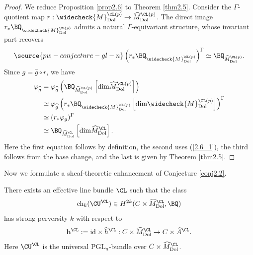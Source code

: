 \begin{proof}
We reduce Proposition \ref{prop2.6} to Theorem \ref{thm2.5}. Consider the $\Gamma$-quotient map $r: \widecheck{M}^{\CL(p)}_{\mathrm{Dol}} \to \widehat{M}^{\CL(p)}_{\mathrm{Dol}}$. The direct image $r_* \BQ_{\widecheck{M}^{\CL(p)}_{\mathrm{Dol}}}$ admits a natural $\Gamma$-equivariant structure, whose invariant part recovers
\begin{equation}\label{2.6_1}
\source{pw-conjecture-gl-n}
\left(r_* \BQ_{\widecheck{M}^{\CL(p)}_{\mathrm{Dol}}}\right)^{\Gamma} \simeq \BQ_{\widehat{M}^{\CL(p)}_{\mathrm{Dol}}}.
\end{equation}
Since $g = \widehat{g}\circ r$, we have
\begin{align*}
\varphi_{\widehat{g}} & = \varphi_{\widehat{g}}\left(\BQ_{\widehat{M}^{\CL(p)}_{\mathrm{Dol}}}\left[\mathrm{dim} \widehat{M}^{\CL(p)}_{\mathrm{Dol}}\right]\right) \\ & \simeq \varphi_{\widehat{g}}\left(r_* \BQ_{\widecheck{M}^{\CL(p)}_{\mathrm{Dol}}}\left[\mathrm{dim} \widecheck{M}^{\CL(p)}_{\mathrm{Dol}}\right]\right)^{\Gamma}\\
& \simeq (r_* \varphi_g)^\Gamma \\ & \simeq  \BQ_{\widehat{M}^{\CL}_{\mathrm{Dol}}}\left[\mathrm{dim} \widehat{M}^{\CL}_{\mathrm{Dol}}\right].
\end{align*}
Here the first equation follows by definition, the second uses (\ref{2.6_1}), the third follows from the base change, and the last is given by Theorem \ref{thm2.5}.
\end{proof}


Now we formulate a sheaf-theoretic enhancement of Conjecture \ref{conj2.2}.

\begin{thm}
\notready\label{conj2.7}
There exists an effective line bundle $\CL$ such that the class
\[
\mathrm{ch}_k(\CU^\CL) \in H^{2k}(C\times \widehat{M}^\CL_{\mathrm{Dol}}, \BQ)
\]
has strong perversity $k$ with respect to
\[
\mathbf{h}^\CL: = \mathrm{id} \times \widehat{h}^\CL:C\times \widehat{M}^\CL_{\mathrm{Dol}} \to C\times \widehat{A}^\CL.
\]
Here $\CU^\CL$ is the universal $\mathrm{PGL}_n$-bundle over $C\times \widehat{M}^\CL_{\mathrm{Dol}}$.
\end{thm}

